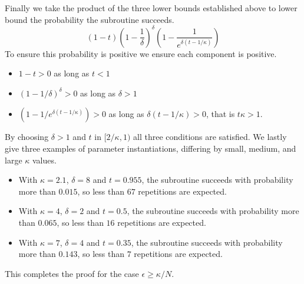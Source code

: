 Finally we take the product of the three lower bounds established above to lower bound the probability the subroutine succeeds.
\begin{equation}
    (1-t)
    \left(1-\frac{1}{\delta}\right)^\delta
    \left(1 - \frac{1}{e^{\delta(t-1/\kappa)}}\right)
\end{equation}
To ensure this probability is positive we ensure each component is positive.
\begin{itemize}
    \item
    $1-t > 0$ as long as $t < 1$
    \item
    $(1-1/\delta)^\delta > 0$ as long as $\delta > 1$
    \item
    $\left(1 - 1/e^{\delta(t-1/\kappa)}\right) > 0$ as long as $\delta(t-1/\kappa) > 0$, that is $t\kappa > 1$.
\end{itemize}
By choosing $\delta > 1$ and $t$ in $[2/\kappa,1)$ all three conditions are satisfied.
We lastly give three examples of parameter instantiations, differing by small, medium, and large $\kappa$ values.
\begin{itemize}
    \item
    With $\kappa = 2.1$, $\delta = 8$ and $t = 0.955$, the subroutine succeeds with probability more than $0.015$, so less than $67$ repetitions are expected.

    \item
    With $\kappa = 4$, $\delta = 2$ and $t = 0.5$, the subroutine succeeds with probability more than $0.065$, so less than $16$ repetitions are expected.

    \item
    With $\kappa = 7$, $\delta = 4$ and $t = 0.35$, the subroutine succeeds with probability more than $0.143$, so less than $7$ repetitions are expected.
\end{itemize}

This completes the proof for the case $\epsilon \geq \kappa/N$.
